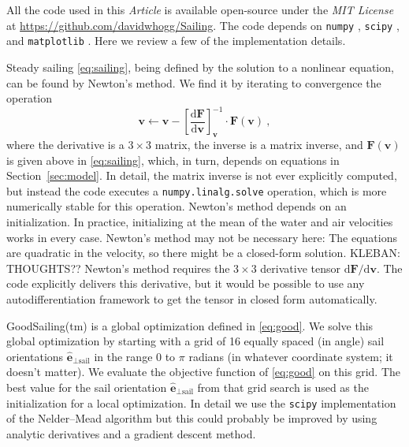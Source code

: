 \documentclass[letterpaper]{article}
\newcommand{\dd}{\mathrm{d}}
\renewcommand{\vec}[1]{\boldsymbol{#1}}
\newcommand{\uvec}{\vec{\hat{e}}}
\newcommand{\sail}{\text{sail}}
\newcommand{\documentname}{\textsl{Article}}
\newcommand{\secref}[1]{Section~\ref{#1}}
\newcommand{\code}[1]{\texttt{#1}}
\begin{document}
All the code used in this \documentname{} is available open-source under the \textsl{MIT License} at \url{https://github.com/davidwhogg/Sailing}.
The code depends on \code{numpy} \cite{numpy}, \code{scipy} \cite{scipy}, and \code{matplotlib} \cite{matplotlib}.
Here we review a few of the implementation details.

Steady sailing \eqref{eq:sailing}, being defined by the solution to a nonlinear equation, can be found by Newton's method.
We find it by iterating to convergence the operation
\begin{equation}
    \vec{v} \leftarrow \vec{v} - \left[\frac{\dd \vec{F}}{\dd \vec{v}}\right]_{\vec{v}}^{-1}\cdot \vec{F}(\vec{v}) ~,
\end{equation}
where the derivative is a $3\times 3$ matrix, the inverse is a matrix inverse, and $\vec{F}(\vec{v})$ is given above in \eqref{eq:sailing}, which, in turn, depends on equations in \secref{sec:model}.
In detail, the matrix inverse is not ever explicitly computed, but instead the code executes a \code{numpy.linalg.solve} \cite{numpy} operation, which is more numerically stable for this operation.
Newton's method depends on an initialization.
In practice, initializing at the mean of the water and air velocities works in every case.
Newton's method may not be necessary here: The equations are quadratic in the velocity, so there might be a closed-form solution. KLEBAN: THOUGHTS??
Newton's method requires the $3\times 3$ derivative tensor $\dd\vec{F}/\dd\vec{v}$.
The code explicitly delivers this derivative, but it would be possible to use any autodifferentiation framework to get the tensor in closed form automatically.

GoodSailing(tm) is a global optimization defined in \eqref{eq:good}.
We solve this global optimization by starting with a grid of 16 equally spaced (in angle) sail orientations $\uvec_{\perp\sail}$ in the range 0 to $\pi$ radians (in whatever coordinate system; it doesn't matter).
We evaluate the objective function of \eqref{eq:good} on this grid.
The best value for the sail orientation $\uvec_{\perp\sail}$ from that grid search is used as the initialization for a local optimization.
In detail we use the \code{scipy} \cite{scipy} implementation of the Nelder--Mead algorithm \cite{nelder-mead} but this could probably be improved by using analytic derivatives and a gradient descent method.
\end{document}
